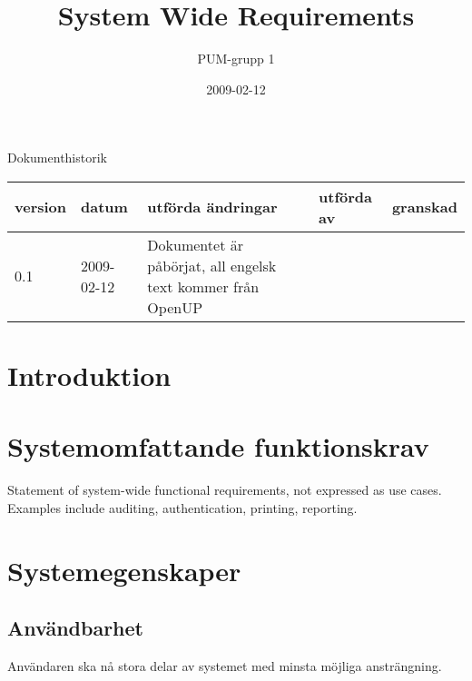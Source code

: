 

\ifpdf
\else
\fi

\title{System Wide Requirements}
\author{PUM-grupp 1}
\date{2009-02-12}



\maketitle\thispagestyle{empty}

\newpage

{\centering \Large{Dokumenthistorik\\}}

\vspace{10pt}
\begin{tabularx}{\textwidth}{ |l|l|X|l|l| }
  \hline
    \textbf{version} & \textbf{datum} & \textbf{utförda ändringar} & \textbf{utförda av} & \textbf{granskad} \\
	\hline 
  0.1 & 2009-02-12 &  Dokumentet är påbörjat, all engelsk text kommer från OpenUP & &   \\
  \hline
\end{tabularx}

\newpage

\setcounter{tocdepth}{2}
\tableofcontents
\newpage

\section{Introduktion}

\section{Systemomfattande funktionskrav}

Statement of system-wide functional requirements, not expressed as use cases. Examples include auditing, authentication, printing, reporting.

\section{Systemegenskaper}
\subsection{Användbarhet}
Användaren ska nå stora delar av systemet med minsta möjliga ansträngning.
